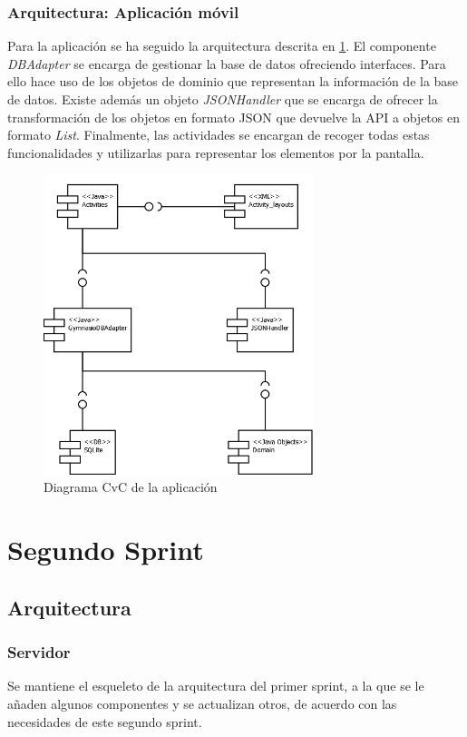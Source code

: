 \documentclass[11pt,a4paper]{report}
\begin{document}
\subsubsection{Arquitectura: Aplicación móvil}
Para la aplicación se ha seguido la arquitectura descrita en \ref{fig: CvCApp}. El componente \textit{DBAdapter} se encarga de gestionar la base de datos ofreciendo interfaces. Para ello hace uso de los objetos de dominio que representan la información de la base de datos. Existe además un objeto \textit{JSONHandler} que se encarga de ofrecer la transformación de los objetos en formato JSON que devuelve la API a objetos en formato \textit{List}.
Finalmente, las actividades se encargan de recoger todas estas funcionalidades y utilizarlas para representar los elementos por la pantalla.
\begin{figure}[H]
	\centering
	\includegraphics[width=0.7\textwidth]{capturicas/CvCApp.png}
	\caption{Diagrama CvC de la aplicación}
	\label{fig: CvCApp}
\end{figure}

\section{Segundo Sprint}
\subsection{Arquitectura}
\subsubsection{Servidor}
Se mantiene el esqueleto de la arquitectura del primer sprint, a la que se le añaden algunos componentes y se actualizan otros, de acuerdo con las necesidades de este segundo sprint.
\end{document}
